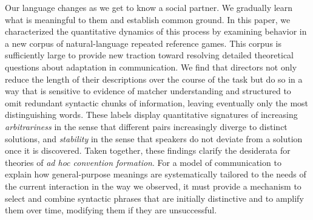 \documentclass[alpha-refs]{wiley-article}
\begin{document}
Our language changes as we get to know a social partner.
We gradually learn what is meaningful to them and establish common ground.
In this paper, we characterized the quantitative dynamics of this process by examining behavior in a new corpus of natural-language repeated reference games.
This corpus is sufficiently large to provide new traction toward resolving detailed theoretical questions about adaptation in communication.
We find that directors not only reduce the length of their descriptions over the course of the task but do so in a way that is sensitive to evidence of matcher understanding and structured to omit redundant syntactic chunks of information, leaving eventually only the most distinguishing words.
These labels display quantitative signatures of increasing \emph{arbitrariness} in the sense that different pairs increasingly diverge to distinct solutions, and \emph{stability} in the sense that speakers do not deviate from a solution once it is discovered.
Taken together, these findings clarify the desiderata for theories of \emph{ad hoc convention formation}.
For a model of communication to explain how general-purpose meanings are systematically tailored to the needs of the current interaction in the way we observed, it must provide a mechanism to select and combine syntactic phrases that are initially distinctive and to amplify them over time, modifying them if they are unsuccessful.
\end{document}

